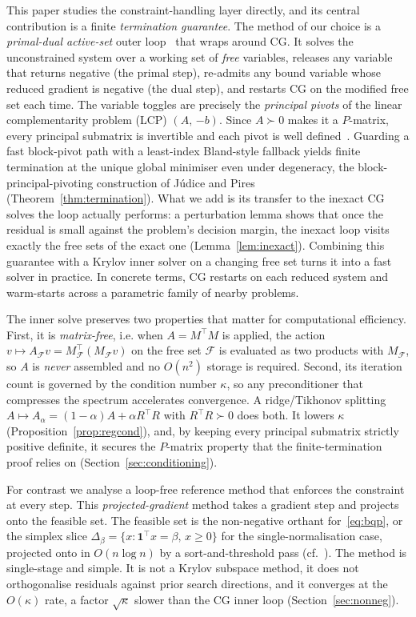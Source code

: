 This paper studies the constraint-handling layer directly, and its central contribution is a finite \emph{termination guarantee}. The method of our choice is a \emph{primal-dual active-set} outer
loop~\cite{nocedal2006} that wraps around CG. It solves the unconstrained system over a working set
of \emph{free} variables, releases any variable that returns negative (the primal step),
re-admits any bound variable whose reduced gradient is negative (the dual step), and restarts
CG on the modified free set each time. The variable toggles are precisely the \emph{principal
pivots} of the linear complementarity problem (LCP) $(A,\,{-b})$. Since $A \succ 0$ makes it a
$P$-matrix, every principal submatrix is invertible and each pivot is well
defined~\cite{murty1988,judice1994,kim2011}. Guarding a fast block-pivot path with a
least-index Bland-style fallback yields finite termination at the unique global minimiser
even under degeneracy, the block-principal-pivoting construction of Júdice and
Pires~\cite{judice1994} (Theorem~\ref{thm:termination}). What we add is its transfer to the
inexact CG solves the loop actually performs: a perturbation lemma shows that
once the residual is small against the problem's decision margin, the inexact loop visits
exactly the free sets of the exact one (Lemma~\ref{lem:inexact}). Combining this guarantee with a Krylov inner solver on a changing free set turns it into a fast solver in practice. In concrete terms, CG restarts on each reduced system and warm-starts across a parametric family of nearby problems.

The inner solve preserves two properties that matter for computational efficiency. First, it is
\emph{matrix-free}, i.e. when $A = M^\top M$ is applied, the action
$v \mapsto A_{\mathcal{F}}v = M_{\mathcal{F}}^\top(M_{\mathcal{F}}v)$ on the free set $\mathcal{F}$ is evaluated as two products with $M_{\mathcal{F}}$, so $A$ is \emph{never}
assembled and no $O(n^2)$ storage is required. Second, its iteration count is governed by the condition number $\kappa$, so any preconditioner that compresses the spectrum accelerates
convergence. A ridge/Tikhonov splitting $A \mapsto A_\alpha = (1-\alpha)A + \alpha R^\top R$
with $R^\top R \succ 0$ does both. It lowers $\kappa$ (Proposition~\ref{prop:regcond}), and,
by keeping every principal submatrix strictly positive definite, it secures the $P$-matrix
property that the finite-termination proof relies on (Section~\ref{sec:conditioning}).

For contrast we analyse a loop-free reference method that enforces the constraint at every
step. This \emph{projected-gradient} method takes a gradient step and projects onto the
feasible set. The feasible set is the non-negative orthant for~\eqref{eq:bqp}, or the simplex
slice $\Delta_\beta = \{x : \mathbf{1}^\top x = \beta,\, x \geq 0\}$ for the
single-normalisation case, projected onto in $O(n\log n)$ by a sort-and-threshold pass
(cf.\ \cite{duchi2008,condat2016}). The method is single-stage and simple. It is not a Krylov
subspace method, it does not orthogonalise residuals against prior search directions, and it converges at the $O(\kappa)$ rate, a factor $\sqrt\kappa$ slower than the CG inner loop (Section~\ref{sec:nonneg}).

